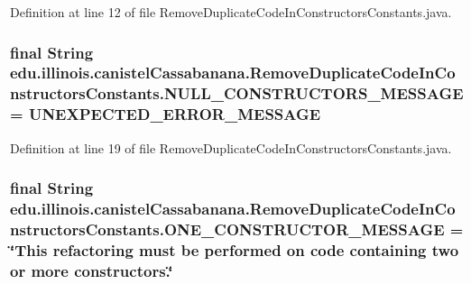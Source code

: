 Definition at line 12 of file RemoveDuplicateCodeInConstructorsConstants.java.

\hypertarget{classedu_1_1illinois_1_1canistelCassabanana_1_1RemoveDuplicateCodeInConstructorsConstants_a2e0637b8a100de734054aff8b12c62b7}{
\subsubsection[{NULL\_\-CONSTRUCTORS\_\-MESSAGE}]{\setlength{\rightskip}{0pt plus 5cm}final String {\bf edu.illinois.canistelCassabanana.RemoveDuplicateCodeInConstructorsConstants.NULL\_\-CONSTRUCTORS\_\-MESSAGE} = {\bf UNEXPECTED\_\-ERROR\_\-MESSAGE}}}
\label{classedu_1_1illinois_1_1canistelCassabanana_1_1RemoveDuplicateCodeInConstructorsConstants_a2e0637b8a100de734054aff8b12c62b7}


Definition at line 19 of file RemoveDuplicateCodeInConstructorsConstants.java.

\hypertarget{classedu_1_1illinois_1_1canistelCassabanana_1_1RemoveDuplicateCodeInConstructorsConstants_ad01fc3d835596cfcb50ebbf54a9c133e}{
\subsubsection[{ONE\_\-CONSTRUCTOR\_\-MESSAGE}]{\setlength{\rightskip}{0pt plus 5cm}final String {\bf edu.illinois.canistelCassabanana.RemoveDuplicateCodeInConstructorsConstants.ONE\_\-CONSTRUCTOR\_\-MESSAGE} = \char`\"{}This refactoring must be performed on code containing two or more constructors.\char`\"{}}}
\label{classedu_1_1illinois_1_1canistelCassabanana_1_1RemoveDuplicateCodeInConstructorsConstants_ad01fc3d835596cfcb50ebbf54a9c133e}


